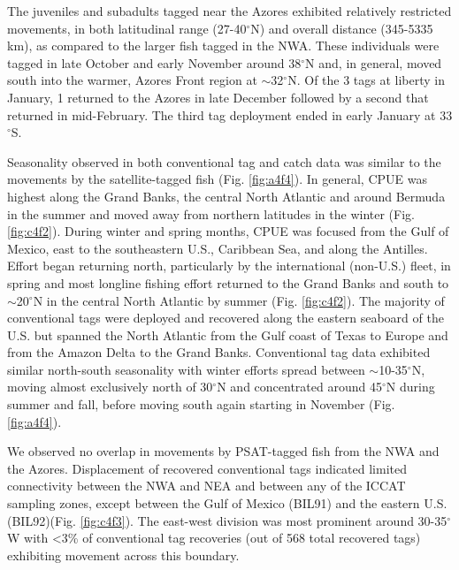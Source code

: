 The juveniles and subadults tagged near the Azores exhibited relatively restricted movements, in both latitudinal range (27-40$^{\circ}$N) and overall distance (345-5335 km), as compared to the larger fish tagged in the NWA. These individuals were tagged in late October and early November around 38$^{\circ}$N and, in general, moved south into the warmer, Azores Front region at $\sim$32$^{\circ}$N. Of the 3 tags at liberty in January, 1 returned to the Azores in late December followed by a second that returned in mid-February. The third tag deployment ended in early January at 33$^{\circ}$S.

Seasonality observed in both conventional tag and catch data was similar to the movements by the satellite-tagged fish (Fig. \cref{fig:a4f4}). In general, CPUE was highest along the Grand Banks, the central North Atlantic and around Bermuda in the summer and moved away from northern latitudes in the winter (Fig. \ref{fig:c4f2}). During winter and spring months, CPUE was focused from the Gulf of Mexico, east to the southeastern U.S., Caribbean Sea, and along the Antilles. Effort began returning north, particularly by the international (non-U.S.) fleet, in spring and most longline fishing effort returned to the Grand Banks and south to $\sim$20$^{\circ}$N in the central North Atlantic by summer (Fig. \ref{fig:c4f2}). The majority of conventional tags were deployed and recovered along the eastern seaboard of the U.S. but spanned the North Atlantic from the Gulf coast of Texas to Europe and from the Amazon Delta to the Grand Banks. Conventional tag data exhibited similar north-south seasonality with winter efforts spread between $\sim$10-35$^{\circ}$N, moving almost exclusively north of 30$^{\circ}$N and concentrated around 45$^{\circ}$N during summer and fall, before moving south again starting in November (Fig. \ref{fig:a4f4}).

We observed no overlap in movements by PSAT-tagged fish from the NWA and the Azores. Displacement of recovered conventional tags indicated limited connectivity between the NWA and NEA and between any of the ICCAT sampling zones, except between the Gulf of Mexico (BIL91) and the eastern U.S. (BIL92)(Fig. \ref{fig:c4f3}). The east-west division was most prominent around 30-35$^{\circ}$W with <3\% of conventional tag recoveries (out of 568 total recovered tags) exhibiting movement across this boundary. 

